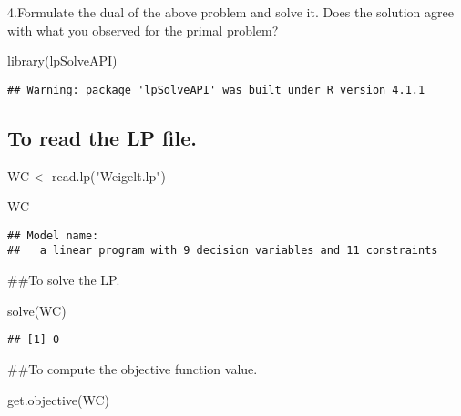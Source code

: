 \documentclass[
]{article}
\newenvironment{Shaded}{\begin{snugshade}}{\end{snugshade}}
\newcommand{\FunctionTok}[1]{\textcolor[rgb]{0.00,0.00,0.00}{#1}}
\newcommand{\NormalTok}[1]{#1}
\newcommand{\OtherTok}[1]{\textcolor[rgb]{0.56,0.35,0.01}{#1}}
\newcommand{\StringTok}[1]{\textcolor[rgb]{0.31,0.60,0.02}{#1}}
\begin{document}
4.Formulate the dual of the above problem and solve it. Does the
solution agree with what you observed for the primal problem?

\begin{Shaded}
\begin{Highlighting}[]
\FunctionTok{library}\NormalTok{(}\StringTok{\textquotesingle{}lpSolveAPI\textquotesingle{}}\NormalTok{)}
\end{Highlighting}
\end{Shaded}

\begin{verbatim}
## Warning: package 'lpSolveAPI' was built under R version 4.1.1
\end{verbatim}

\hypertarget{to-read-the-lp-file.}{%
\subsection{To read the LP file.}\label{to-read-the-lp-file.}}

\begin{Shaded}
\begin{Highlighting}[]
\NormalTok{WC }\OtherTok{\textless{}{-}} \FunctionTok{read.lp}\NormalTok{(}\StringTok{"Weigelt.lp"}\NormalTok{)}

\NormalTok{WC}
\end{Highlighting}
\end{Shaded}

\begin{verbatim}
## Model name: 
##   a linear program with 9 decision variables and 11 constraints
\end{verbatim}

\#\#To solve the LP.

\begin{Shaded}
\begin{Highlighting}[]
\FunctionTok{solve}\NormalTok{(WC)}
\end{Highlighting}
\end{Shaded}

\begin{verbatim}
## [1] 0
\end{verbatim}

\#\#To compute the objective function value.

\begin{Shaded}
\begin{Highlighting}[]
\FunctionTok{get.objective}\NormalTok{(WC)}
\end{Highlighting}
\end{Shaded}
\end{document}
